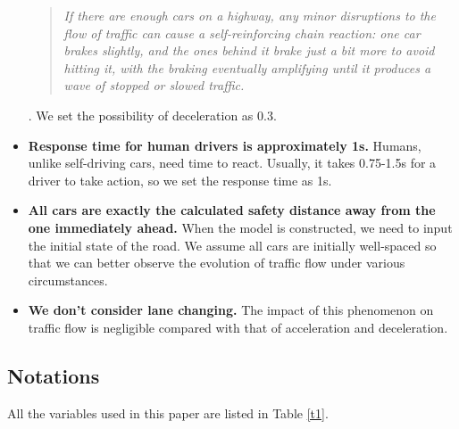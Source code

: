 \documentclass[a4paper]{article}
\begin{document}
\begin{itemize}
{			\begin{quote}\textit{If there are enough cars on a highway, any minor disruptions to the flow of traffic can cause a self-reinforcing chain reaction: one car brakes slightly, and the ones behind it brake just a bit more to avoid hitting it, with the braking eventually amplifying until it produces a wave of stopped or slowed traffic.}\cite{phantom}\end{quote}}. We set the possibility of deceleration as 0.3.
		\item \textbf{Response time for human drivers is approximately 1s.} Humans, unlike self-driving cars, need time to react. Usually, it takes 0.75-1.5s for a driver to take action, so we set the response time as 1s.
		\item \textbf{All cars are exactly the calculated safety distance away from the one immediately ahead.} When the model is constructed, we need to input the initial state of the road. We assume all cars are initially well-spaced so that we can better observe the evolution of traffic flow under various circumstances. 
		\item \textbf{We don’t consider lane changing.} The impact of this phenomenon on traffic flow is negligible compared with that of acceleration and deceleration. 
	\end{itemize}
	
	
	\subsection{Notations}
	All the variables used in this paper are listed in Table \ref{t1}.
	
\end{document}
